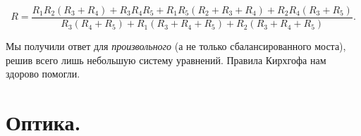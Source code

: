 \documentclass[11pt,a4paper]{article}
\numberwithin{equation}{section}
\begin{document}
\begin{equation}
  \label{eq:bridge_answer}
  R = \frac{R_1R_2 (R_3 + R_4) + R_3 R_4 R_5 + R_1 R_5 (R_2 + R_3 +
    R_4) +R_2 R_4 (R_3 + R_5)}{R_3 (R_4 + R_5) + R_1 (R_3 + R_4 + R_5)
  + R_2 (R_3 + R_4 +R_5)}.
\end{equation}

Мы получили ответ для \textit{произвольного} (а не только
сбалансированного моста), решив всего лишь небольшую систему
уравнений. Правила Кирхгофа нам здорово помогли. 


\section{Оптика.}
\label{sec:optics}
\end{document}
